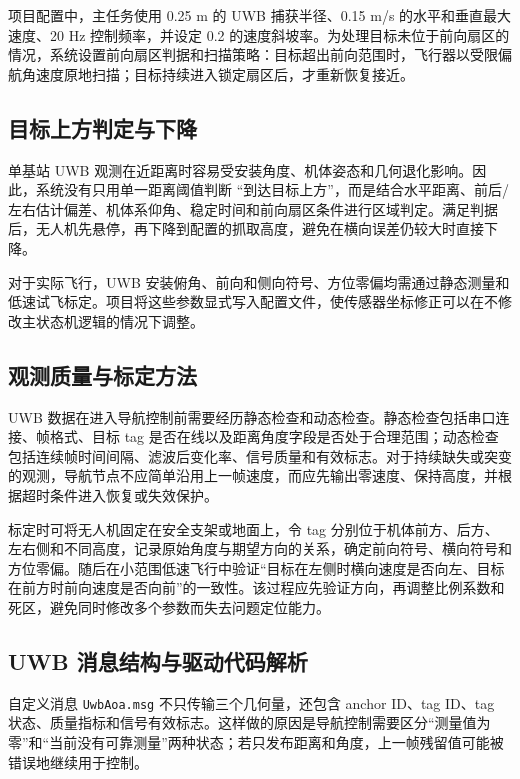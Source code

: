 \documentclass[12pt,a4paper]{ctexart}
\begin{document}
项目配置中，主任务使用 0.25 m 的 UWB 捕获半径、0.15 m/s 的水平和垂直最大速度、20 Hz 控制频率，并设定 0.2 的速度斜坡率。为处理目标未位于前向扇区的情况，系统设置前向扇区判据和扫描策略：目标超出前向范围时，飞行器以受限偏航角速度原地扫描；目标持续进入锁定扇区后，才重新恢复接近。

\subsection{目标上方判定与下降}
单基站 UWB 观测在近距离时容易受安装角度、机体姿态和几何退化影响。因此，系统没有只用单一距离阈值判断 ``到达目标上方''，而是结合水平距离、前后/左右估计偏差、机体系仰角、稳定时间和前向扇区条件进行区域判定。满足判据后，无人机先悬停，再下降到配置的抓取高度，避免在横向误差仍较大时直接下降。

对于实际飞行，UWB 安装俯角、前向和侧向符号、方位零偏均需通过静态测量和低速试飞标定。项目将这些参数显式写入配置文件，使传感器坐标修正可以在不修改主状态机逻辑的情况下调整。

\subsection{观测质量与标定方法}
UWB 数据在进入导航控制前需要经历静态检查和动态检查。静态检查包括串口连接、帧格式、目标 tag 是否在线以及距离角度字段是否处于合理范围；动态检查包括连续帧时间间隔、滤波后变化率、信号质量和有效标志。对于持续缺失或突变的观测，导航节点不应简单沿用上一帧速度，而应先输出零速度、保持高度，并根据超时条件进入恢复或失效保护。

标定时可将无人机固定在安全支架或地面上，令 tag 分别位于机体前方、后方、左右侧和不同高度，记录原始角度与期望方向的关系，确定前向符号、横向符号和方位零偏。随后在小范围低速飞行中验证“目标在左侧时横向速度是否向左、目标在前方时前向速度是否向前”的一致性。该过程应先验证方向，再调整比例系数和死区，避免同时修改多个参数而失去问题定位能力。

\subsection{UWB 消息结构与驱动代码解析}
自定义消息 \texttt{UwbAoa.msg} 不只传输三个几何量，还包含 anchor ID、tag ID、tag 状态、质量指标和信号有效标志。这样做的原因是导航控制需要区分“测量值为零”和“当前没有可靠测量”两种状态；若只发布距离和角度，上一帧残留值可能被错误地继续用于控制。
\end{document}
